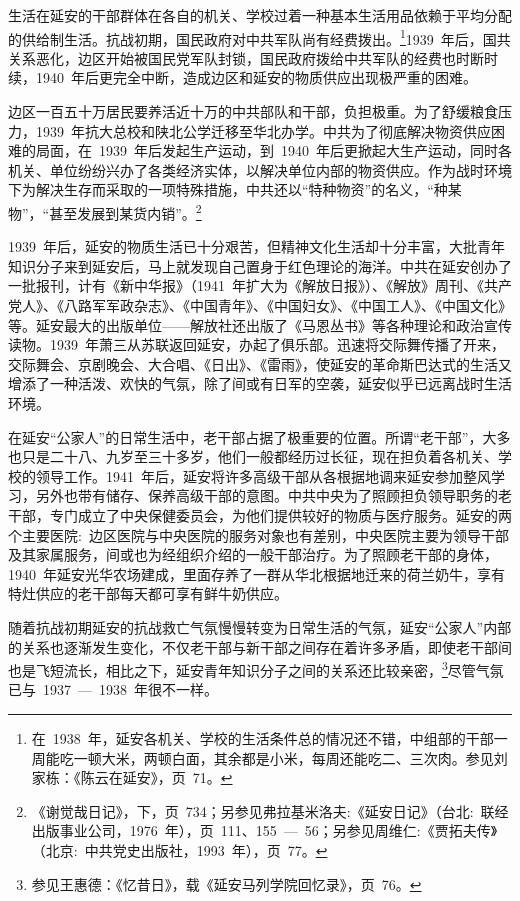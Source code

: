 生活在延安的干部群体在各自的机关、学校过着一种基本生活用品依赖于平均分配的供给制生活。抗战初期，国民政府对中共军队尚有经费拨出。\footnote{在~1938~年，延安各机关、学校的生活条件总的情况还不错，中组部的干部一周能吃一顿大米，两顿白面，其余都是小米，每周还能吃二、三次肉。参见刘家栋：《陈云在延安》，页~71。}1939~年后，国共关系恶化，边区开始被国民党军队封锁，国民政府拨给中共军队的经费也时断时续，1940~年后更完全中断，造成边区和延安的物质供应出现极严重的困难。

边区一百五十万居民要养活近十万的中共部队和干部，负担极重。为了舒缓粮食压力，1939~年抗大总校和陕北公学迁移至华北办学。中共为了彻底解决物资供应困难的局面，在~1939~年后发起生产运动，到~1940~年后更掀起大生产运动，同时各机关、单位纷纷兴办了各类经济实体，以解决单位内部的物资供应。作为战时环境下为解决生存而采取的一项特殊措施，中共还以“特种物资”的名义，“种某物”，“甚至发展到某货内销”。\footnote{《谢觉哉日记》，下，页~734；另参见弗拉基米洛夫:《延安日记》（台北:~联经出版事业公司，1976~年），页~111、155~—~56；另参见周维仁:《贾拓夫传》（北京:~中共党史出版社，1993~年），页~77。}

1939~年后，延安的物质生活已十分艰苦，但精神文化生活却十分丰富，大批青年知识分子来到延安后，马上就发现自己置身于红色理论的海洋。中共在延安创办了一批报刊，计有《新中华报》（1941~年扩大为《解放日报》）、《解放》周刊、《共产党人》、《八路军军政杂志》、《中国青年》、《中国妇女》、《中国工人》、《中国文化》等。延安最大的出版单位——解放社还出版了《马恩丛书》等各种理论和政治宣传读物。1939~年萧三从苏联返回延安，办起了俱乐部。迅速将交际舞传播了开来，交际舞会、京剧晚会、大合唱、《日出》、《雷雨》，使延安的革命斯巴达式的生活又增添了一种活泼、欢快的气氛，除了间或有日军的空袭，延安似乎已远离战时生活环境。

在延安“公家人”的日常生活中，老干部占据了极重要的位置。所谓“老干部”，大多也只是二十八、九岁至三十多岁，他们一般都经历过长征，现在担负着各机关、学校的领导工作。1941~年后，延安将许多高级干部从各根据地调来延安参加整风学习，另外也带有储存、保养高级干部的意图。中共中央为了照顾担负领导职务的老干部，专门成立了中央保健委员会，为他们提供较好的物质与医疗服务。延安的两个主要医院:~边区医院与中央医院的服务对象也有差别，中央医院主要为领导干部及其家属服务，间或也为经组织介绍的一般干部治疗。为了照顾老干部的身体，1940~年延安光华农场建成，里面存养了一群从华北根据地迁来的荷兰奶牛，享有特灶供应的老干部每天都可享有鲜牛奶供应。

随着抗战初期延安的抗战救亡气氛慢慢转变为日常生活的气氛，延安“公家人”内部的关系也逐渐发生变化，不仅老干部与新干部之间存在着许多矛盾，即使老干部间也是飞短流长，相比之下，延安青年知识分子之间的关系还比较亲密，\footnote{参见王惠德：《忆昔日》，载《延安马列学院回忆录》，页~76。}尽管气氛已与~1937~—~1938~年很不一样。

